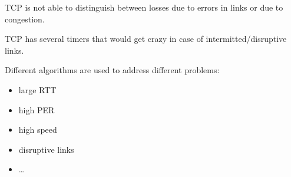 TCP is not able to distinguish between losses due to errors in links or due
to congestion.

TCP has several timers that would get crazy in case of intermitted/disruptive
links.

Different algorithms are used to address different problems:

\begin{itemize}
  \item large RTT
  \item high PER
  \item high speed
  \item disruptive links
  \item \dots
\end{itemize}


